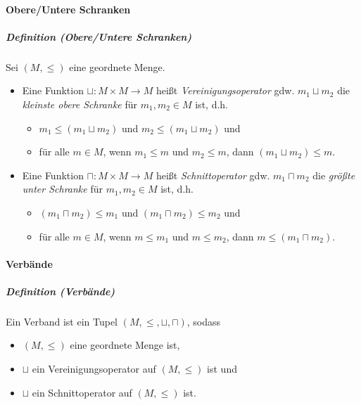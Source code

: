 \documentclass[a4paper, 11pt, accentcolor = tud3b]{tudreport}
\newcommand{\definition}[2]{\subparagraph{Definition (#1)} #2}
\begin{document}
		    \paragraph{Obere/Untere Schranken}
			    \definition{Obere/Untere Schranken}{
				    Sei $ (M, \leq) $ eine geordnete Menge.
				    \begin{itemize}
				    	\item Eine Funktion $ \sqcup : M \times M \rightarrow M $ heißt \textit{Vereinigungsoperator} gdw. $ m _ 1 \sqcup m _ 2 $ die \textit{kleinste obere Schranke} für $ m _ 1, m _ 2 \in M $ ist, d.h.
					    	\begin{itemize}
					    		\item $ m _ 1 \leq (m _ 1 \sqcup m _ 2) $ und $ m _ 2 \leq (m _ 1 \sqcup m _ 2) $ und
					    		\item für alle $ m \in M $, wenn $ m _ 1 \leq m $ und $ m _ 2 \leq m $, dann $ (m _ 1 \sqcup m _ 2) \leq m $.
					    	\end{itemize}
					    \item Eine Funktion $ \sqcap : M \times M \rightarrow M $ heißt \textit{Schnittoperator} gdw. $ m _ 1 \sqcap m _ 2 $ die \textit{größte unter Schranke} für $ m _ 1, m _ 2 \in M $ ist, d.h.
						    \begin{itemize}
						    	\item $ (m _ 1 \sqcap m _ 2) \leq m _ 1 $ und $ (m _ 1 \sqcap m _ 2) \leq m _ 2 $ und
						    	\item für alle $ m \in M $, wenn $ m \leq m _ 1 $ und $ m \leq m _ 2 $, dann $ m  \leq (m _ 1 \sqcap m _ 2) $.
						    \end{itemize}
				    \end{itemize}
				}
		    
		    \paragraph{Verbände}
			    \definition{Verbände}{
				    Ein Verband ist ein Tupel $ (M, \leq, \sqcup, \sqcap) $, sodass
				    \begin{itemize}
				    	\item $ (M, \leq) $ eine geordnete Menge ist,
				    	\item $ \sqcup $ ein Vereinigungsoperator auf $ (M, \leq) $ ist und
				    	\item $ \sqcup $ ein Schnittoperator auf $ (M, \leq) $ ist.
				    \end{itemize}
				}
\end{document}
